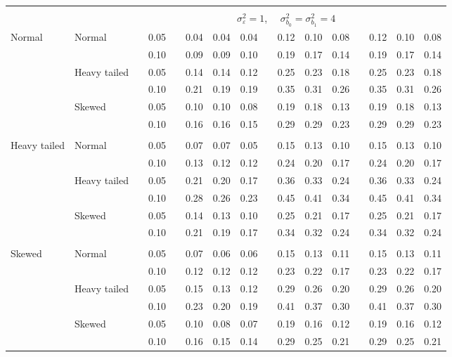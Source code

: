 \documentclass[11pt]{article} %
\begin{document}
\begin{table}[ht]
\begin{scriptsize}
\begin{center}
\begin{tabular}{ll p{.1cm} c p{.1cm} rrr p{.1cm} rrr p{.1cm} rrr}
&&&&&&&&&&&&&&&\\
& && && \multicolumn{9}{c}{$\sigma_{\varepsilon}^2 = 1$, \ \ $\sigma_{b_0}^2 = \sigma_{b_1}^2 = 4$} \\ \cline{6-16}
Normal       & Normal       && 0.05 &&  0.04 & 0.04 & 0.04 && 0.12 & 0.10 & 0.08 && 0.12 & 0.10 & 0.08 \\ 
             &              && 0.10 &&  0.09 & 0.09 & 0.10 && 0.19 & 0.17 & 0.14 && 0.19 & 0.17 & 0.14 \\ 
             & Heavy tailed && 0.05 &&  0.14 & 0.14 & 0.12 && 0.25 & 0.23 & 0.18 && 0.25 & 0.23 & 0.18 \\ 
             &              && 0.10 &&  0.21 & 0.19 & 0.19 && 0.35 & 0.31 & 0.26 && 0.35 & 0.31 & 0.26 \\ 
             & Skewed       && 0.05 &&  0.10 & 0.10 & 0.08 && 0.19 & 0.18 & 0.13 && 0.19 & 0.18 & 0.13 \\ 
             &              && 0.10 &&  0.16 & 0.16 & 0.15 && 0.29 & 0.29 & 0.23 && 0.29 & 0.29 & 0.23 \\ 
             &&&&&&&&&&&&&&&\\
Heavy tailed & Normal       && 0.05 &&  0.07 & 0.07 & 0.05 && 0.15 & 0.13 & 0.10 && 0.15 & 0.13 & 0.10 \\ 
             &              && 0.10 &&  0.13 & 0.12 & 0.12 && 0.24 & 0.20 & 0.17 && 0.24 & 0.20 & 0.17 \\ 
             & Heavy tailed && 0.05 &&  0.21 & 0.20 & 0.17 && 0.36 & 0.33 & 0.24 && 0.36 & 0.33 & 0.24 \\ 
             &              && 0.10 &&  0.28 & 0.26 & 0.23 && 0.45 & 0.41 & 0.34 && 0.45 & 0.41 & 0.34 \\ 
             & Skewed       && 0.05 &&  0.14 & 0.13 & 0.10 && 0.25 & 0.21 & 0.17 && 0.25 & 0.21 & 0.17 \\ 
             &              && 0.10 &&  0.21 & 0.19 & 0.17 && 0.34 & 0.32 & 0.24 && 0.34 & 0.32 & 0.24 \\ 
             &&&&&&&&&&&&&&&\\
Skewed       & Normal       && 0.05 &&  0.07 & 0.06 & 0.06 && 0.15 & 0.13 & 0.11 && 0.15 & 0.13 & 0.11 \\ 
             &              && 0.10 &&  0.12 & 0.12 & 0.12 && 0.23 & 0.22 & 0.17 && 0.23 & 0.22 & 0.17 \\ 
             & Heavy tailed && 0.05 &&  0.15 & 0.13 & 0.12 && 0.29 & 0.26 & 0.20 && 0.29 & 0.26 & 0.20 \\ 
             &              && 0.10 &&  0.23 & 0.20 & 0.19 && 0.41 & 0.37 & 0.30 && 0.41 & 0.37 & 0.30 \\ 
             & Skewed       && 0.05 &&  0.10 & 0.08 & 0.07 && 0.19 & 0.16 & 0.12 && 0.19 & 0.16 & 0.12 \\ 
             &              && 0.10 &&  0.16 & 0.15 & 0.14 && 0.29 & 0.25 & 0.21 && 0.29 & 0.25 & 0.21 \\ 



\end{tabular}
\end{center}
\end{scriptsize}
\end{table}
\end{document}
